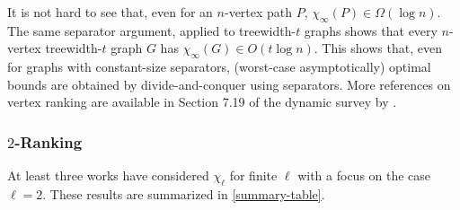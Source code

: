 \documentclass[kpfonts]{patmorin}
\newcommand{\lrn}{\chi_{\ell}}
\theoremstyle{named}
\begin{document}
It is not hard to see that, even for an $n$-vertex path $P$, $\chi_\infty(P)\in\Omega(\log n)$.  The same separator argument, applied to treewidth-$t$ graphs shows that every $n$-vertex treewidth-$t$ graph $G$ has $\chi_\infty(G)\in O(t\log n)$.  This shows that, even for graphs with constant-size separators, (worst-case asymptotically) optimal bounds are obtained by divide-and-conquer using separators.  More references on vertex ranking are available in Section 7.19 of the dynamic survey by \citet{gallian:dynamic}.

\subsubsection{$2$-Ranking}

At least three works have considered $\lrn$ for finite $\ell$ with a focus on the case $\ell=2$.  These results are summarized in \cref{summary-table}.
\end{document}
